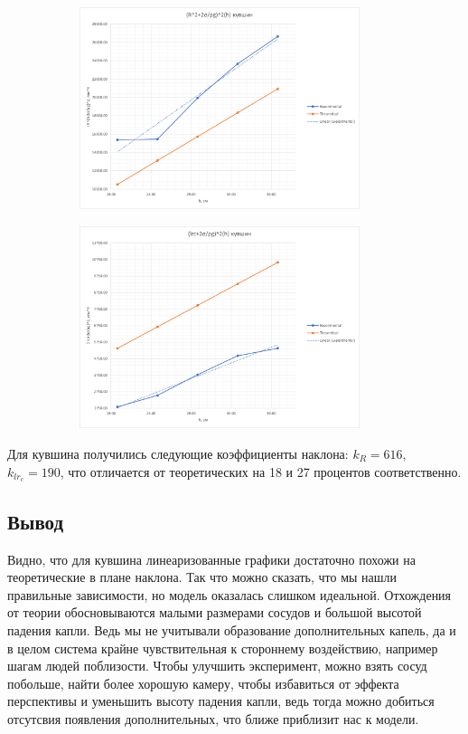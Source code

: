 \documentclass[a4paper, 12pt]{article}
\begin{document}
\begin{figure}[H]
    \begin{subfigure}{0.5\textwidth}
        \includegraphics[width=0.9\textwidth]{img/linear R кувшин.png}
    \end{subfigure}%
    \begin{subfigure}{0.5\textwidth}
        \includegraphics[width=0.9\textwidth]{img/linear lrc кувшин.png}
    \end{subfigure}
\end{figure}

Для кувшина получились следующие коэффициенты наклона:
$k_R = 616$, $k_{lr_c} = 190$,
что отличается от теоретических на 18 и 27 процентов соответственно.

\subsection*{Вывод}
Видно, что для кувшина линеаризованные графики достаточно похожи на
теоретические в плане наклона. Так что можно сказать, что мы нашли
правильные зависимости, но модель оказалась слишком идеальной.
Отхождения от теории обосновываются малыми размерами сосудов и большой
высотой падения капли. Ведь мы не учитывали образование дополнительных
капель, да и в целом система крайне чувствительная к стороннему
воздействию, например шагам людей поблизости. Чтобы улучшить эксперимент,
можно взять сосуд побольше, найти более хорошую камеру, чтобы избавиться
от эффекта перспективы и уменьшить высоту падения капли, ведь тогда
можно добиться отсутсвия появления дополнительных, что ближе приблизит
нас к модели.
\end{document}
